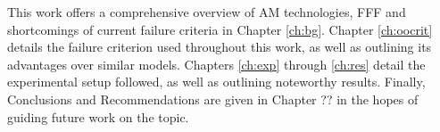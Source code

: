 \documentclass[main.tex]{subfiles}
\begin{document}
This work offers a comprehensive overview of AM technologies, FFF and shortcomings of current failure criteria in Chapter \ref{ch:bg}. Chapter \ref{ch:oocrit} details the failure criterion used throughout this work, as well as outlining its advantages over similar models. Chapters \ref{ch:exp} through \ref{ch:res} detail the experimental setup followed, as well as outlining noteworthy results. Finally, Conclusions and Recommendations are given in Chapter ?? in the hopes of guiding future work on the topic. %

% 
%
%
%
\end{document}
